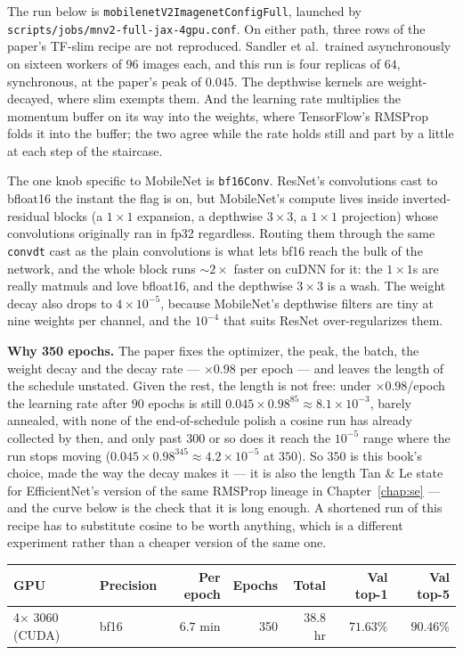\noindent The run below is \texttt{mobilenetV2ImagenetConfigFull}, launched
by \texttt{scripts/jobs/\allowbreak mnv2-full-jax-4gpu.conf}. On either
path, three rows of the paper's TF-slim recipe are not reproduced. Sandler
et al.\ trained asynchronously on sixteen workers of $96$ images each, and
this run is four replicas of $64$, synchronous, at the paper's peak of
$0.045$. The depthwise kernels are weight-decayed, where slim exempts them.
And the learning rate multiplies the momentum buffer on its way into the
weights, where TensorFlow's RMSProp folds it into the buffer; the two agree
while the rate holds still and part by a little at each step of the
staircase.

The one knob specific to MobileNet is \texttt{bf16Conv}. ResNet's
convolutions cast to bfloat16 the instant the flag is on, but MobileNet's
compute lives inside inverted-residual blocks (a $1\times1$ expansion, a
depthwise $3\times3$, a $1\times1$ projection) whose convolutions
originally ran in fp32 regardless. Routing them through the same
\texttt{convdt} cast as the plain convolutions is what lets bf16 reach the
bulk of the network, and the whole block runs $\sim2\times$ faster on
cuDNN for it: the $1\times1$s are really matmuls and love bfloat16, and the
depthwise $3\times3$ is a wash. The weight decay also drops to
$4\times10^{-5}$, because MobileNet's depthwise filters are tiny at nine
weights per channel, and the $10^{-4}$ that suits ResNet over-regularizes
them.

\textbf{Why 350 epochs.} The paper fixes the optimizer, the peak, the
batch, the weight decay and the decay rate --- $\times0.98$ per epoch ---
and leaves the length of the schedule unstated. Given the rest, the length
is not free: under $\times 0.98$/epoch the learning rate after $90$ epochs
is still $0.045 \times 0.98^{85} \approx 8.1\times10^{-3}$, barely
annealed, with none of the end-of-schedule polish a cosine run has already
collected by then, and only past $300$ or so does it reach the
$10^{-5}$ range where the run stops moving ($0.045 \times 0.98^{345}
\approx 4.2\times10^{-5}$ at $350$). So $350$ is this book's choice, made
the way the decay makes it --- it is also the length Tan \& Le state for
EfficientNet's version of the same RMSProp lineage in
Chapter~\ref{chap:se} --- and the curve below is the check that it is
long enough. A shortened run of this recipe has to substitute cosine to be
worth anything, which is a different experiment rather than a cheaper
version of the same one.

\begin{center}
\begin{tabular}{l l r r r r r}
\hline
GPU & Precision & Per epoch & Epochs & Total & Val top-1 & Val top-5 \\
\hline
4$\times$ 3060 (CUDA) & bf16 & $6.7$ min & 350 & $38.8$ hr & $\mathbf{71.63\%}$ & $\mathbf{90.46\%}$ \\
\hline
\end{tabular}
\end{center}


